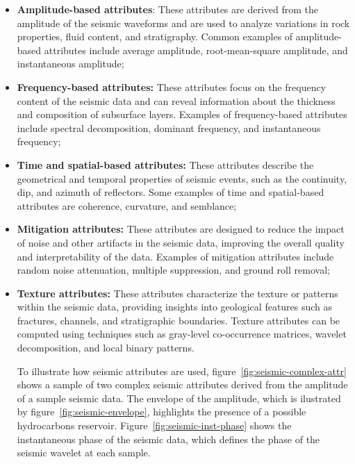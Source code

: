 \begin{itemize}
    \item \textbf{Amplitude-based attributes}: These attributes are derived from the amplitude of the seismic waveforms and are used to analyze variations in rock properties, fluid content, and stratigraphy.
        Common examples of amplitude-based attributes include average amplitude, root-mean-square amplitude, and instantaneous amplitude;
    \item \textbf{Frequency-based attributes:} These attributes focus on the frequency content of the seismic data and can reveal information about the thickness and composition of subsurface layers.
        Examples of frequency-based attributes include spectral decomposition, dominant frequency, and instantaneous frequency;
    \item \textbf{Time and spatial-based attributes:} These attributes describe the geometrical and temporal properties of seismic events, such as the continuity, dip, and azimuth of reflectors.
        Some examples of time and spatial-based attributes are coherence, curvature, and semblance;
    \item \textbf{Mitigation attributes:} These attributes are designed to reduce the impact of noise and other artifacts in the seismic data, improving the overall quality and interpretability of the data.
        Examples of mitigation attributes include random noise attenuation, multiple suppression, and ground roll removal;
    \item \textbf{Texture attributes:} These attributes characterize the texture or patterns within the seismic data, providing insights into geological features such as fractures, channels, and stratigraphic boundaries.
        Texture attributes can be computed using techniques such as gray-level co-occurrence matrices, wavelet decomposition, and local binary patterns.

To illustrate how seismic attributes are used, figure~\ref{fig:seismic-complex-attr} shows a sample of two complex seismic attributes derived from the amplitude of a sample seismic data.
The envelope of the amplitude, which is ilustrated by figure~\ref{fig:seismic-envelope}, highlights the presence of a possible hydrocarbons reservoir.
Figure~\ref{fig:seismic-inst-phase} shows the instantaneous phase of the seismic data, which defines the phase of the seismic wavelet at each sample.

\begin{figure}[htb!]
    \captionsetup[subfigure]{justification=centering}
    \centering


\end{figure}
\end{itemize}
